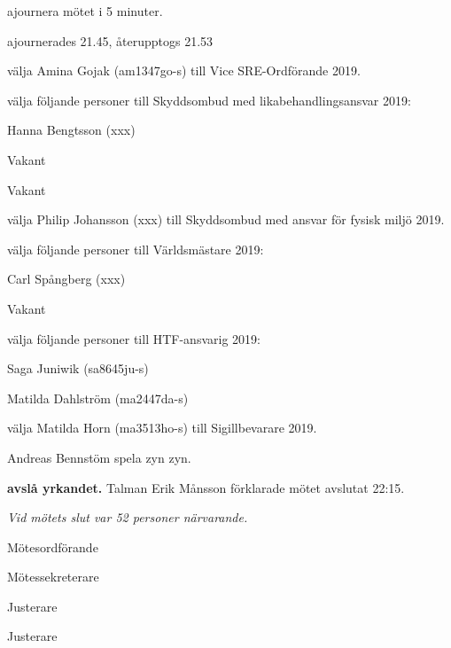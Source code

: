 \documentclass[10pt]{article}
\def\mo{Erik Månsson}
\def\ms{Axel Voss}
\def\ji{Rasmus Sobel}
\def\jii{Niklas Gustafson}
\begin{document}
\begin{paragrafer}
\begin{paralist}
    \Mba ajournera mötet i 5 minuter. 

    \Mba ajournerades 21.45, återupptogs 21.53
    
    \Mba välja Amina Gojak (am1347go-s) till Vice SRE-Ordförande 2019.

    \Mba välja följande personer till Skyddsombud med likabehandlingsansvar 2019:
    \begin{tightdashlist}
        \item Hanna Bengtsson (xxx)
        \item Vakant
        \item Vakant
    \end{tightdashlist}

    \Mba välja Philip Johansson (xxx) till Skyddsombud med ansvar för fysisk miljö 2019.

    \Mba välja följande personer till Världsmästare 2019:
    \begin{tightdashlist}
        \item Carl Spångberg (xxx)
        \item Vakant
    \end{tightdashlist}

    \Mba välja följande personer till HTF-ansvarig 2019:
    \begin{tightdashlist}
        \item Saga Juniwik (sa8645ju-s)
        \item Matilda Dahlström (ma2447da-s)
    \end{tightdashlist}

    \Mba välja Matilda Horn (ma3513ho-s) till Sigillbevarare 2019.
    

\end{paralist}

Andreas Bennstöm \ypa spela zyn zyn.

\textbf{\Mba avslå yrkandet.}
Talman {\mo} förklarade mötet avslutat 22:15.

\emph{Vid mötets slut var 52 personer närvarande.}

\end{paragrafer}

\newpage
\hidesignfoot
\begin{signatures}{4}
\signature{\mo}{Mötesordförande}
\signature{\ms}{Mötessekreterare}
\signature{\ji}{Justerare}
\signature{\jii}{Justerare}
\end{signatures}
\end{document}
